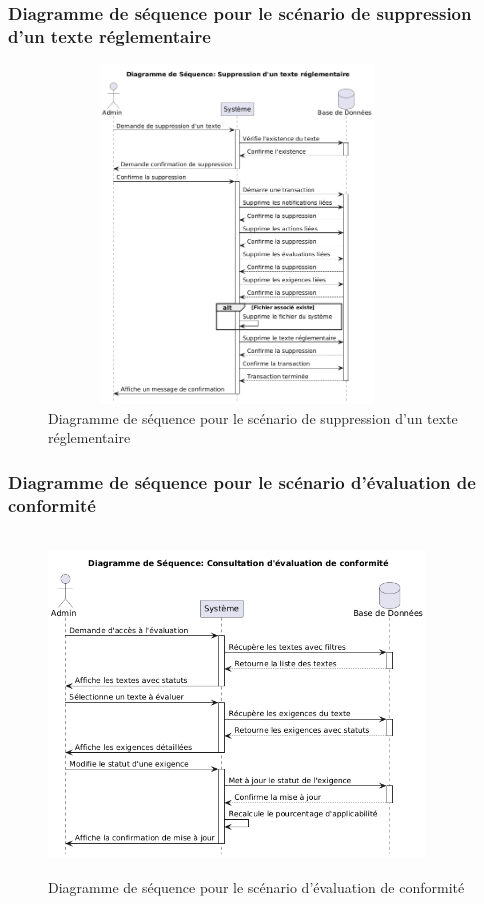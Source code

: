\subsubsection{Diagramme de séquence pour le scénario de suppression d'un texte réglementaire}
\begin{figure}[H]
    \centering
    \includegraphics[width=10cm,height=9cm]{images/deletetextseq.png}
    \caption{Diagramme de séquence pour le scénario de suppression d'un texte réglementaire}
\end{figure}

\subsubsection{Diagramme de séquence pour le scénario d'évaluation de conformité}
\begin{figure}[H]
    \centering
    \includegraphics[width=10cm,height=9cm]{images/complianceseq.png}
    \caption{Diagramme de séquence pour le scénario d'évaluation de conformité}
\end{figure}

